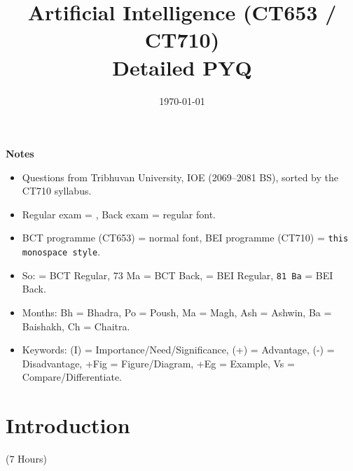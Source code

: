 \documentclass[12pt]{article}
\title{Artificial Intelligence (CT653 / CT710)\\[0.4em]\large Detailed PYQ}
\author{}
\date{\today}
\begin{document}
\maketitle
\vspace{6cm}
\textbf{Notes}
\begin{itemize}[noitemsep]
  \item Questions from Tribhuvan University, IOE (2069--2081 BS), sorted by the CT710 syllabus.
  \item Regular exam = , Back exam = regular font.
  \item BCT programme (CT653) = normal font, BEI programme (CT710) = \texttt{this monospace style}.
  \item So:  = BCT Regular, 73 Ma = BCT Back,  = BEI Regular, \texttt{81 Ba} = BEI Back.
  \item Months: Bh = Bhadra, Po = Poush, Ma = Magh, Ash = Ashwin, Ba = Baishakh, Ch = Chaitra.
  \item Keywords: (I) = Importance/Need/Significance, (+) = Advantage, (-) = Disadvantage, +Fig = Figure/Diagram, +Eg = Example, Vs = Compare/Differentiate.
\end{itemize}
\pagebreak
\tableofcontents
\pagebreak

\section{Introduction}
\begin{center}(7 Hours)\end{center}
\end{document}
